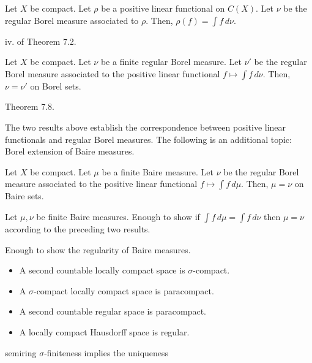 \documentclass[a4paper,12pt]{report}
\begin{document}
\begin{prb}
Let $X$ be compact.
Let $\rho$ be a positive linear functional on $C(X)$.
Let $\nu$ be the regular Borel measure associated to $\rho$.
Then, $\rho(f)=\int f\,d\nu$.
\end{prb}
\begin{sol}
iv. of Theorem 7.2.
\end{sol}

\begin{prb}
Let $X$ be compact.
Let $\nu$ be a finite regular Borel measure.
Let $\nu'$ be the regular Borel measure associated to the positive linear functional $f\mapsto\int f\,d\nu$.
Then, $\nu=\nu'$ on Borel sets.
\end{prb}
\begin{sol}
Theorem 7.8.
\end{sol}

The two results above establish the correspondence between positive linear functionals and regular Borel measures.
The following is an additional topic: Borel extension of Baire measures.
\begin{prb}
Let $X$ be compact.
Let $\mu$ be a finite Baire measure.
Let $\nu$ be the regular Borel measure associated to the positive linear functional $f\mapsto\int f\,d\mu$.
Then, $\mu=\nu$ on Baire sets.
\end{prb}
\begin{sol}
Let $\mu,\nu$ be finite Baire measures.
Enough to show if $\int f\,d\mu=\int f\,d\nu$ then $\mu=\nu$ according to the preceding two results.

Enough to show the regularity of Baire measures.
\end{sol}







\begin{itemize}
\item A second countable locally compact space is $\sigma$-compact.
\item A $\sigma$-compact locally compact space is paracompact.
\item A second countable regular space is paracompact.
\item A locally compact Hausdorff space is regular.
\end{itemize}

semiring
$\sigma$-finiteness implies the uniqueness
\end{document}
